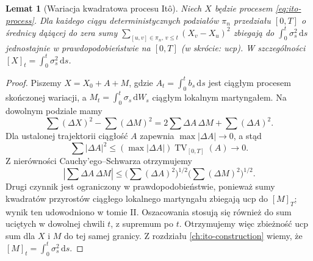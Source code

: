 \documentclass[11pt,a4paper,oneside]{report}
\numberwithin{equation}{chapter}
\theoremstyle{plain}
\newtheorem{lemat}[twierdzenie]{Lemat}
\theoremstyle{definition}
\theoremstyle{remark}
\newcommand{\dd}{\mathrm{d}}
\begin{document}
\begin{lemat}[Wariacja kwadratowa procesu Itô]\label{lem:volIII:03:01}
\label{lem:ito-qv}
Niech $X$ będzie procesem \eqref{eq:ito-process}. Dla
każdego ciągu deterministycznych podziałów $\pi_n$ przedziału
$[0,T]$ o średnicy dążącej do zera sumy
$\sum_{[u,v]\in\pi_n,\,v\le t}(X_v-X_u)^2$
zbiegają do $\int_0^t\sigma_s^2\,\dd s$ jednostajnie
w prawdopodobieństwie na $[0,T]$ (w skrócie: ucp).
W szczególności $[X]_t=\int_0^t\sigma_s^2\,\dd s$.
\end{lemat}
\begin{proof}
Piszemy $X=X_0+A+M$, gdzie
$A_t=\int_0^tb_s\,\dd s$ jest ciągłym procesem
skończonej wariacji, a $M_t=\int_0^t\sigma_s\,\dd W_s$
ciągłym lokalnym martyngałem. Na dowolnym podziale mamy
\[
\sum(\Delta X)^2-\sum(\Delta M)^2
=2\sum\Delta A\,\Delta M+\sum(\Delta A)^2.
\]
Dla ustalonej trajektorii ciągłość $A$ zapewnia
$\max|\Delta A|\to0$, a stąd
\[
\sum|\Delta A|^2
\le (\max|\Delta A|)\operatorname{TV}_{[0,T]}(A)
\longrightarrow0.
\]
Z nierówności Cauchy'ego--Schwarza otrzymujemy
\[
\left|\sum\Delta A\,\Delta M\right|
\le\Big(\sum(\Delta A)^2\Big)^{1/2}
\Big(\sum(\Delta M)^2\Big)^{1/2}.
\]
Drugi czynnik jest ograniczony w prawdopodobieństwie,
ponieważ sumy kwadratów przyrostów ciągłego lokalnego
martyngału zbiegają ucp do $[M]_T$; wynik ten udowodniono
w tomie II. Oszacowania stosują się również do sum
uciętych w dowolnej chwili $t$, z supremum po $t$.
Otrzymujemy więc zbieżność ucp sum dla $X$ i $M$ do
tej samej granicy. Z rozdziału \ref{ch:ito-construction}
wiemy, że $[M]_t=\int_0^t\sigma_s^2\,\dd s$.
\end{proof}
\end{document}

